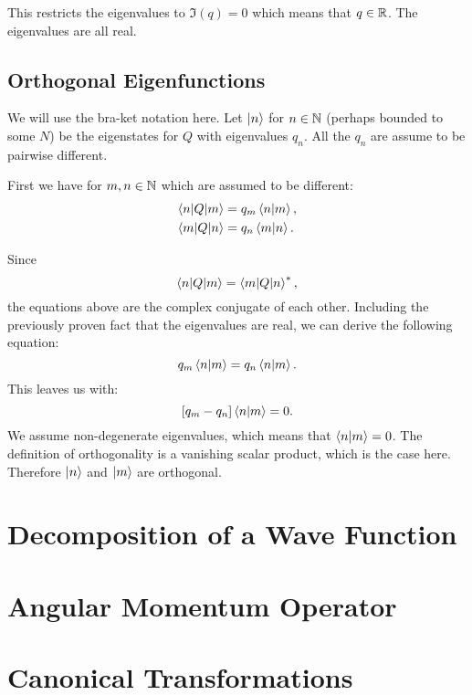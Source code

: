 \documentclass[11pt, ngerman, fleqn, DIV=15, headinclude]{scrartcl}
\begin{document}
This restricts the eigenvalues to $\Im(q) = 0$ which means that $q \in \mathbb R$. The
eigenvalues are all real.

\subsection{Orthogonal Eigenfunctions}

We will use the bra-ket notation here. Let $\ket n$ for $n \in \mathbb N$ (perhaps
bounded to some $N$) be the eigenstates for $Q$ with eigenvalues $q_n$. All the
$q_n$ are assume to be pairwise different.

First we have for $m, n \in \mathbb N$ which are assumed to be different:
\begin{align*}
    \braket{n | Q | m} &= q_m \braket{n | m}, \\
    \braket{m | Q | n} &= q_n \braket{m | n}.
\end{align*}

Since
\[
    \braket{n | Q | m} = \braket{m | Q | n}^*,
\]
the equations above are the complex conjugate of each other. Including the
previously proven fact that the eigenvalues are real, we can derive the
following equation:
\[
    q_m \braket{n|m} = q_n \braket{n|m}.
\]
This leaves us with:
\[
    [q_m - q_n] \braket{n|m} = 0.
\]
We assume non-degenerate eigenvalues, which means that $\braket{n|m} = 0$. The
definition of orthogonality is a vanishing scalar product, which is the case
here. Therefore $\ket n$ and $\ket m$ are orthogonal.

\section{Decomposition of a Wave Function}

\section{Angular Momentum Operator}

\section{Canonical Transformations}
\end{document}
